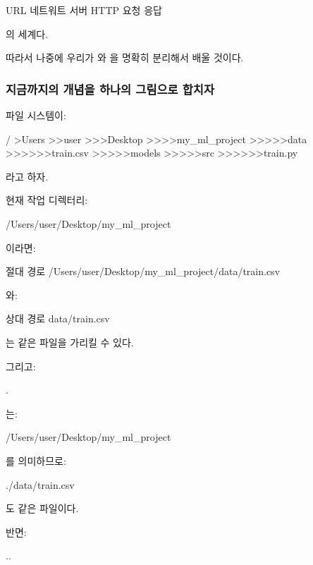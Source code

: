 \begin{dhksmry}[centered]
URL
\da
네트워트
\da
서버
\da
HTTP 요청
\da
응답
\end{dhksmry}

의 세계다.

따라서 나중에 우리가 와 을 명확히 분리해서 배울 것이다.

\subsubsection{지금까지의 개념을 하나의 그림으로 합치자}

파일 시스템이:

\begin{dhkdir}
/
>Users
>>user
>>>Desktop
>>>>my_ml_project
>>>>>data
>>>>>>train.csv
>>>>>models
>>>>>src
>>>>>>train.py
\end{dhkdir}

라고 하자.

현재 작업 디렉터리:

\begin{dhkzsh}
/Users/user/Desktop/my_ml_project
\end{dhkzsh}

이라면:

\begin{dhkzsh}
절대 경로
/Users/user/Desktop/my_ml_project/data/train.csv
\end{dhkzsh}

와:

\begin{dhkzsh}
상대 경로
data/train.csv
\end{dhkzsh}

는 같은 파일을 가리킬 수 있다.

그리고:

\begin{dhkzsh}
.
\end{dhkzsh}

는:

\begin{dhkzsh}
/Users/user/Desktop/my_ml_project
\end{dhkzsh}

를 의미하므로:

\begin{dhkzsh}
./data/train.csv
\end{dhkzsh}

도 같은 파일이다.

반면:

\begin{dhkzsh}
..
\end{dhkzsh}

